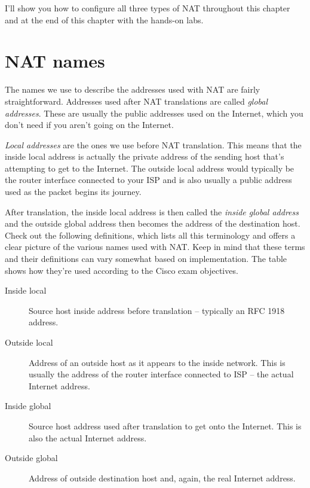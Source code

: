 I'll show you how to configure all three types of NAT throughout this chapter and at the end of this chapter with the hands-on labs.


\section{NAT names}

The names we use to describe the addresses used with NAT are fairly straightforward.
Addresses used after NAT translations are called \emph{global addresses}.
These are usually the public addresses used on the Internet, which you don't need if you aren't going on the Internet.

\emph{Local addresses} are the ones we use before NAT translation.
This means that the inside local address is actually the private address of the sending host that's attempting to get to the Internet.
The outside local address would typically be the router interface connected to your ISP and is also usually a public address used as the packet begins its journey.

After translation,
the inside local address is then called the \emph{inside global address}
and the outside global address then becomes the address of the destination host.
Check out the following definitions, which lists all this terminology and offers a clear picture of the various names
used with NAT. Keep in mind that these terms and their definitions can
vary somewhat based on implementation. The table shows how they're used according to the Cisco exam objectives.

\begin{description}
   \item[Inside local]
      Source host inside address before translation -- typically an RFC 1918 address.
   \item[Outside local]
      Address of an outside host as it appears to the inside network.
      This is usually the address of the router interface connected to ISP -- the actual Internet address.
   \item[Inside global]
      Source host address used after translation to get onto the Internet.
      This is also the actual Internet address.
   \item[Outside global]
      Address of outside destination host and, again, the real Internet address.
\end{description}




